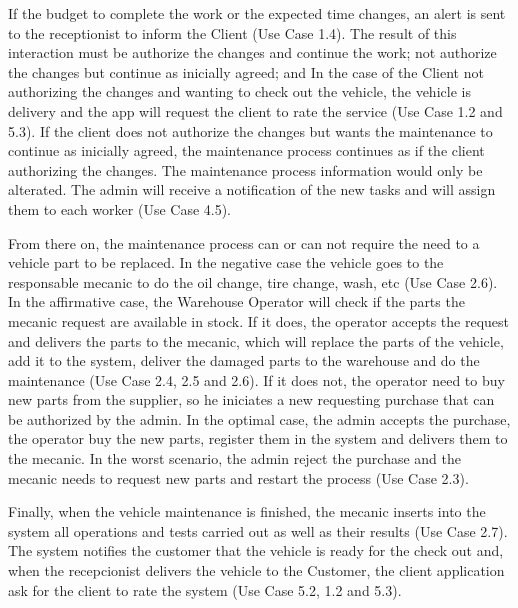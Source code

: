If the budget to complete the work or the expected time changes, an alert is sent to the receptionist to inform the Client (Use Case 1.4). 
The result of this interaction must be authorize the changes and continue the work; not authorize the changes but continue as inicially agreed; and 
In the case of the Client not authorizing the changes and wanting to check out the vehicle, the vehicle is delivery and the app will request the client to rate the service (Use Case 1.2 and 5.3). 
If the client does not authorize the changes but wants the maintenance to continue as inicially agreed, the maintenance process continues as if the client authorizing the changes. 
The maintenance process information would only be alterated.
The admin will receive a notification of the new tasks and will assign them to each worker (Use Case 4.5).

From there on, the maintenance process can or can not require the need to a vehicle part to be replaced. 
In the negative case the vehicle goes to the responsable mecanic to do the oil change, tire change, wash, etc (Use Case 2.6). 
In the affirmative case, the Warehouse Operator will check if the parts the mecanic request are available in stock. 
If it does, the operator accepts the request and delivers the parts to the mecanic, which will replace the parts of the vehicle, add it to the system, deliver the damaged parts to the warehouse and do the maintenance (Use Case 2.4, 2.5 and 2.6). 
If it does not, the operator need to buy new parts from the supplier, so he iniciates a new requesting purchase that can be authorized by the admin. 
In the optimal case, the admin accepts the purchase, the operator buy the new parts, register them in the system and delivers them to the mecanic. 
In the worst scenario, the admin reject the purchase and the mecanic needs to request new parts and restart the process (Use Case 2.3).    

Finally, when the vehicle maintenance is finished, the mecanic inserts into the system all operations and tests carried out as well as their results (Use Case 2.7). 
The system notifies the customer that the vehicle is ready for the check out and, when the recepcionist delivers the vehicle to the Customer, the client application ask for the client to rate the system (Use Case 5.2, 1.2 and 5.3).

